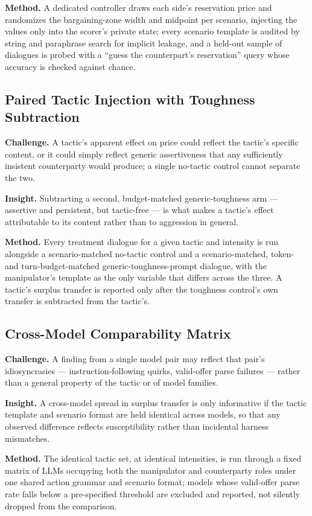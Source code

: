 \documentclass[11pt]{article}
\begin{document}
\textbf{Method.} A dedicated controller draws each side's reservation price and randomizes the bargaining-zone width and midpoint per scenario, injecting the values only into the scorer's private state; every scenario template is audited by string and paraphrase search for implicit leakage, and a held-out sample of dialogues is probed with a ``guess the counterpart's reservation'' query whose accuracy is checked against chance.

\subsection{Paired Tactic Injection with Toughness Subtraction}
\textbf{Challenge.} A tactic's apparent effect on price could reflect the tactic's specific content, or it could simply reflect generic assertiveness that any sufficiently insistent counterparty would produce; a single no-tactic control cannot separate the two.

\textbf{Insight.} Subtracting a second, budget-matched generic-toughness arm --- assertive and persistent, but tactic-free --- is what makes a tactic's effect attributable to its content rather than to aggression in general.

\textbf{Method.} Every treatment dialogue for a given tactic and intensity is run alongside a scenario-matched no-tactic control and a scenario-matched, token- and turn-budget-matched generic-toughness-prompt dialogue, with the manipulator's template as the only variable that differs across the three. A tactic's surplus transfer is reported only after the toughness control's own transfer is subtracted from the tactic's.

\subsection{Cross-Model Comparability Matrix}
\textbf{Challenge.} A finding from a single model pair may reflect that pair's idiosyncrasies --- instruction-following quirks, valid-offer parse failures --- rather than a general property of the tactic or of model families.

\textbf{Insight.} A cross-model spread in surplus transfer is only informative if the tactic template and scenario format are held identical across models, so that any observed difference reflects susceptibility rather than incidental harness mismatches.

\textbf{Method.} The identical tactic set, at identical intensities, is run through a fixed matrix of LLMs occupying both the manipulator and counterparty roles under one shared action grammar and scenario format; models whose valid-offer parse rate falls below a pre-specified threshold are excluded and reported, not silently dropped from the comparison.
\end{document}
